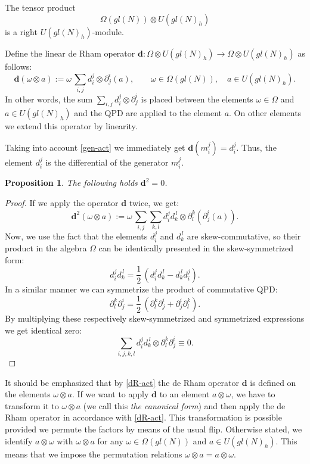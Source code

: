 \documentclass[10pt,a4paper]{amsart}
\newcommand{\pa}{\partial}
\newcommand{\ot}{\otimes}
\newcommand{\UU}{U(gl(N)_h)}
\newcommand{\Om}{\Omega}
\newcommand{\om}{\omega}
\newcommand{\dd}{\mathbf{d}}
\numberwithin{equation}{section}
\newtheorem{proposition}[theorem]{Proposition}
\begin{document}
The tensor product
\begin{equation}
\Om(gl(N))\ot U(gl(N)_h) \label{produc}
\end{equation}
is a right $U(gl(N)_h)$-module.

Define the linear de Rham operator $\dd: \Omega\otimes U(gl(N)_h)\rightarrow \Omega\otimes U(gl(N)_h)$ as
follows:
\begin{equation}
\dd(\om\ot a):= \om\, \sum_{i, j} d_i^j\ot \pa_j^i(a),\qquad \om\in \Om(gl(N)),\quad a\in \UU.
\label{dR-act}
\end{equation}
In other words, the sum $\sum_{i, j} d_i^j\ot \pa_j^i$ is placed  between the elements $\om\in \Om$ and $a\in U(gl(N)_h)$ and  the
QPD are applied to the  element $a$. On other elements we extend this operator by linearity. 

Taking into account \eqref{gen-act} we immediately get $\dd(m_i^j)= d_i^j$. Thus, the element $d_i^j$ is  the differential of the
generator $m_i^j$.

\begin{proposition}
The following holds $ \dd^2=0$.
\end{proposition}

\begin{proof}
If we apply the operator $\dd$ twice, we get:
\[
\dd^2(\om\ot a):=  \om\, \sum_{i, j} \sum_{k, l}d_i^j d_k^{\,l} \ot \pa_l^k(\pa_j^i(a)).
\]
Now, we use the fact that the elements $d_i^j$ and $d_k^{\,l}$ are skew-commutative, so their product in the algebra $\Om$ can
be identically presented in the skew-symmetrized form:
\[
d_i^jd_k^{\,l} = \frac{1}{2}\,(d_i^jd_k^{\,l}-d_k^{\,l}d_i^j).
\]
In a similar manner we can symmetrize the product of commutative QPD:
\[
\pa_l^k\pa_j^i = \frac{1}{2}\,(\pa_l^k\pa_j^i+\pa_j^i \pa_l^k).
\]
By multiplying these respectively skew-symmetrized and symmetrized expressions we get identical zero:
\[
\sum_{i,j,k,l}
d_i^j d_k^{\,l} \ot \pa_l^k\pa_j^i\equiv 0.
\]
\end{proof}

It should be emphasized that by \eqref{dR-act} the de Rham operator $\dd$ is defined on the elements $\om \ot a$. If we want to apply
$\dd$ to an element $a\ot \om$, we have to transform it to $\om \ot a$ (we call this {\em the canonical form}) and then apply
the de Rham operator in accordance with \eqref{dR-act}. This transformation is possible provided we permute the factors by means
of the usual flip. Otherwise stated, we identify $a\otimes \omega$ with $\omega\otimes a $ for any $\om\in \Om(gl(N))$ and
$a\in  U(gl(N)_h)$. This means that we impose the permutation relations $\om\ot a=a\ot\om$.
\end{document}
